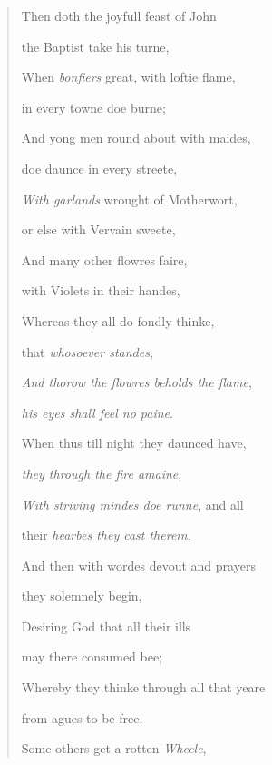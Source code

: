 \documentclass[a4paper, 11pt, oneside, polutonikogreek, english]{article}
\begin{document}
\begin{quotation}\small
Then doth the joyfull feast of John

\hspace*{5mm}the Baptist take his turne,

When \emph{bonfiers} great, with loftie flame,

\hspace*{5mm}in every towne doe burne;

And yong men round about with maides,

\hspace*{5mm}doe daunce in every streete,

\emph{With garlands} wrought of Motherwort,

\hspace*{5mm}or else with Vervain sweete,

And many other flowres faire,

\hspace*{5mm}with Violets in their handes,

Whereas they all do fondly thinke,

\hspace*{5mm}that \emph{whosoever standes},

\emph{And thorow the flowres beholds the flame},

\hspace*{5mm}\emph{his eyes shall feel no paine}.

When thus till night they daunced have,

\hspace*{5mm}\emph{they through the fire amaine},

\emph{With striving mindes doe runne}, and all

\hspace*{5mm}their \emph{hearbes they cast therein},

And then with wordes devout and prayers

\hspace*{5mm}they solemnely begin,

Desiring God that all their ills

\hspace*{5mm}may there consumed bee;

Whereby they thinke through all that yeare

\hspace*{5mm}from agues to be free.

Some others get a rotten \emph{Wheele},


\end{quotation}
\end{document}
